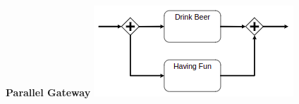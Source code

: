     \begin{minipage}[t]{0.3\textwidth}
    \centering
    \textbf{Parallel Gateway}
    \newline
    \newline
    \newline
    \newline
    \newline
	\includegraphics[width=1.05\linewidth]{images/BPMN_parallel-gateway.png}
    \end{minipage}
    
